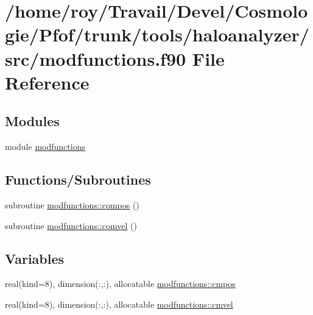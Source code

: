 \hypertarget{modfunctions_8f90}{}\section{/home/roy/\+Travail/\+Devel/\+Cosmologie/\+Pfof/trunk/tools/haloanalyzer/src/modfunctions.f90 File Reference}
\label{modfunctions_8f90}
\subsection*{Modules}
\begin{DoxyCompactItemize}
\item 
module \hyperlink{namespacemodfunctions}{modfunctions}
\end{DoxyCompactItemize}
\subsection*{Functions/\+Subroutines}
\begin{DoxyCompactItemize}
\item 
subroutine \hyperlink{namespacemodfunctions_a1a7eec1462345f2255d2ad6335cebf18}{modfunctions\+::compos} ()
\item 
subroutine \hyperlink{namespacemodfunctions_a6b87ef6f6d1a6bf25c4a0439e01cd0f0}{modfunctions\+::comvel} ()
\end{DoxyCompactItemize}
\subsection*{Variables}
\begin{DoxyCompactItemize}
\item 
real(kind=8), dimension(\+:,\+:), allocatable \hyperlink{namespacemodfunctions_a71740bc327f63502e10951f11e4eff8d}{modfunctions\+::cmpos}
\item 
real(kind=8), dimension(\+:,\+:), allocatable \hyperlink{namespacemodfunctions_a277e0476f0b8e3abcf80fdf935b0fa41}{modfunctions\+::cmvel}
\end{DoxyCompactItemize}
